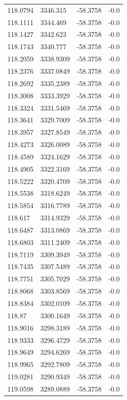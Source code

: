 \begin{table}[H]
\begin{tabular}{llll}
118.0794 & 3346.315 & -58.3758 & -0.0 \\
118.1111 & 3344.469 & -58.3758 & -0.0 \\
118.1427 & 3342.623 & -58.3758 & -0.0 \\
118.1743 & 3340.777 & -58.3758 & -0.0 \\
118.2059 & 3338.9309 & -58.3758 & -0.0 \\
118.2376 & 3337.0849 & -58.3758 & -0.0 \\
118.2692 & 3335.2389 & -58.3758 & -0.0 \\
118.3008 & 3333.3929 & -58.3758 & -0.0 \\
118.3324 & 3331.5469 & -58.3758 & -0.0 \\
118.3641 & 3329.7009 & -58.3758 & -0.0 \\
118.3957 & 3327.8549 & -58.3758 & -0.0 \\
118.4273 & 3326.0089 & -58.3758 & -0.0 \\
118.4589 & 3324.1629 & -58.3758 & -0.0 \\
118.4905 & 3322.3169 & -58.3758 & -0.0 \\
118.5222 & 3320.4709 & -58.3758 & -0.0 \\
118.5538 & 3318.6249 & -58.3758 & -0.0 \\
118.5854 & 3316.7789 & -58.3758 & -0.0 \\
118.617 & 3314.9329 & -58.3758 & -0.0 \\
118.6487 & 3313.0869 & -58.3758 & -0.0 \\
118.6803 & 3311.2409 & -58.3758 & -0.0 \\
118.7119 & 3309.3949 & -58.3758 & -0.0 \\
118.7435 & 3307.5489 & -58.3758 & -0.0 \\
118.7751 & 3305.7029 & -58.3758 & -0.0 \\
118.8068 & 3303.8569 & -58.3758 & -0.0 \\
118.8384 & 3302.0109 & -58.3758 & -0.0 \\
118.87 & 3300.1649 & -58.3758 & -0.0 \\
118.9016 & 3298.3189 & -58.3758 & -0.0 \\
118.9333 & 3296.4729 & -58.3758 & -0.0 \\
118.9649 & 3294.6269 & -58.3758 & -0.0 \\
118.9965 & 3292.7809 & -58.3758 & -0.0 \\
119.0281 & 3290.9349 & -58.3758 & -0.0 \\
119.0598 & 3289.0889 & -58.3758 & -0.0 \\

\end{tabular}
\end{table}
